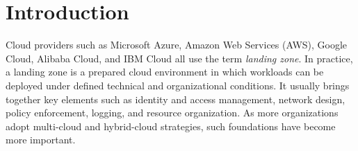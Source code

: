 \section{Introduction}
\label{sec:introduction}


Cloud providers such as Microsoft Azure, Amazon Web Services (AWS), Google Cloud, Alibaba Cloud, and IBM Cloud all use the term \emph{landing zone}. In practice, a landing zone is a prepared cloud environment in which workloads can be deployed under defined technical and organizational conditions. It usually brings together key elements such as identity and access management, network design, policy enforcement, logging, and resource organization. As more organizations adopt multi-cloud and hybrid-cloud strategies, such foundations have become more important.

